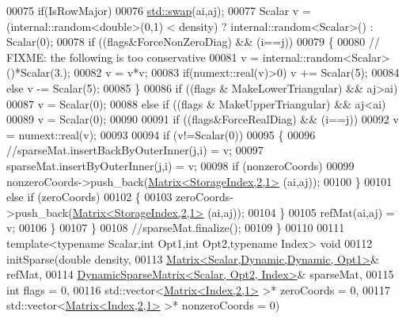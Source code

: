 \begin{DoxyCode}
00075       \textcolor{keywordflow}{if}(IsRowMajor)
00076         \hyperlink{endian_8c_a3ca5ecd34b04d6a243c054ac3a57f68d}{std::swap}(ai,aj);
00077       Scalar v = (internal::random<double>(0,1) < density) ? internal::random<Scalar>() : Scalar(0);
00078       \textcolor{keywordflow}{if} ((flags&ForceNonZeroDiag) && (i==j))
00079       \{
00080         \textcolor{comment}{// FIXME: the following is too conservative}
00081         v = internal::random<Scalar>()*Scalar(3.);
00082         v = v*v;
00083         \textcolor{keywordflow}{if}(numext::real(v)>0) v += Scalar(5);
00084         \textcolor{keywordflow}{else}                  v -= Scalar(5);
00085       \}
00086       \textcolor{keywordflow}{if} ((flags & MakeLowerTriangular) && aj>ai)
00087         v = Scalar(0);
00088       \textcolor{keywordflow}{else} \textcolor{keywordflow}{if} ((flags & MakeUpperTriangular) && aj<ai)
00089         v = Scalar(0);
00090 
00091       \textcolor{keywordflow}{if} ((flags&ForceRealDiag) && (i==j))
00092         v = numext::real(v);
00093 
00094       \textcolor{keywordflow}{if} (v!=Scalar(0))
00095       \{
00096         \textcolor{comment}{//sparseMat.insertBackByOuterInner(j,i) = v;}
00097         sparseMat.insertByOuterInner(j,i) = v;
00098         \textcolor{keywordflow}{if} (nonzeroCoords)
00099           nonzeroCoords->push\_back(\hyperlink{group___core___module_class_eigen_1_1_matrix}{Matrix<StorageIndex,2,1>} (ai,aj));
00100       \}
00101       \textcolor{keywordflow}{else} \textcolor{keywordflow}{if} (zeroCoords)
00102       \{
00103         zeroCoords->push\_back(\hyperlink{group___core___module_class_eigen_1_1_matrix}{Matrix<StorageIndex,2,1>} (ai,aj));
00104       \}
00105       refMat(ai,aj) = v;
00106     \}
00107   \}
00108   \textcolor{comment}{//sparseMat.finalize();}
00109 \}
00110 
00111 \textcolor{keyword}{template}<\textcolor{keyword}{typename} Scalar,\textcolor{keywordtype}{int} Opt1,\textcolor{keywordtype}{int} Opt2,\textcolor{keyword}{typename} Index> \textcolor{keywordtype}{void}
00112 initSparse(\textcolor{keywordtype}{double} density,
00113            \hyperlink{group___core___module_class_eigen_1_1_matrix}{Matrix<Scalar,Dynamic,Dynamic, Opt1>}& refMat,
00114            \hyperlink{class_eigen_1_1_dynamic_sparse_matrix}{DynamicSparseMatrix<Scalar, Opt2, Index>}& sparseMat,
00115            \textcolor{keywordtype}{int} flags = 0,
00116            std::vector<\hyperlink{group___core___module_class_eigen_1_1_matrix}{Matrix<Index,2,1>} >* zeroCoords = 0,
00117            std::vector<\hyperlink{group___core___module_class_eigen_1_1_matrix}{Matrix<Index,2,1>} >* nonzeroCoords = 0)

\end{DoxyCode}
